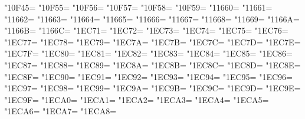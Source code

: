 \XeTeXcharclass"10F45=\KclassArabU
\XeTeXcharclass"10F55=\KclassArabU
\XeTeXcharclass"10F56=\KclassArabU
\XeTeXcharclass"10F57=\KclassArabU
\XeTeXcharclass"10F58=\KclassArabU
\XeTeXcharclass"10F59=\KclassArabU
\XeTeXcharclass"11660=\KclassArabU
\XeTeXcharclass"11661=\KclassArabU
\XeTeXcharclass"11662=\KclassArabU
\XeTeXcharclass"11663=\KclassArabU
\XeTeXcharclass"11664=\KclassArabU
\XeTeXcharclass"11665=\KclassArabU
\XeTeXcharclass"11666=\KclassArabU
\XeTeXcharclass"11667=\KclassArabU
\XeTeXcharclass"11668=\KclassArabU
\XeTeXcharclass"11669=\KclassArabU
\XeTeXcharclass"1166A=\KclassArabU
\XeTeXcharclass"1166B=\KclassArabU
\XeTeXcharclass"1166C=\KclassArabU
\XeTeXcharclass"1EC71=\KclassArabU
\XeTeXcharclass"1EC72=\KclassArabU
\XeTeXcharclass"1EC73=\KclassArabU
\XeTeXcharclass"1EC74=\KclassArabU
\XeTeXcharclass"1EC75=\KclassArabU
\XeTeXcharclass"1EC76=\KclassArabU
\XeTeXcharclass"1EC77=\KclassArabU
\XeTeXcharclass"1EC78=\KclassArabU
\XeTeXcharclass"1EC79=\KclassArabU
\XeTeXcharclass"1EC7A=\KclassArabU
\XeTeXcharclass"1EC7B=\KclassArabU
\XeTeXcharclass"1EC7C=\KclassArabU
\XeTeXcharclass"1EC7D=\KclassArabU
\XeTeXcharclass"1EC7E=\KclassArabU
\XeTeXcharclass"1EC7F=\KclassArabU
\XeTeXcharclass"1EC80=\KclassArabU
\XeTeXcharclass"1EC81=\KclassArabU
\XeTeXcharclass"1EC82=\KclassArabU
\XeTeXcharclass"1EC83=\KclassArabU
\XeTeXcharclass"1EC84=\KclassArabU
\XeTeXcharclass"1EC85=\KclassArabU
\XeTeXcharclass"1EC86=\KclassArabU
\XeTeXcharclass"1EC87=\KclassArabU
\XeTeXcharclass"1EC88=\KclassArabU
\XeTeXcharclass"1EC89=\KclassArabU
\XeTeXcharclass"1EC8A=\KclassArabU
\XeTeXcharclass"1EC8B=\KclassArabU
\XeTeXcharclass"1EC8C=\KclassArabU
\XeTeXcharclass"1EC8D=\KclassArabU
\XeTeXcharclass"1EC8E=\KclassArabU
\XeTeXcharclass"1EC8F=\KclassArabU
\XeTeXcharclass"1EC90=\KclassArabU
\XeTeXcharclass"1EC91=\KclassArabU
\XeTeXcharclass"1EC92=\KclassArabU
\XeTeXcharclass"1EC93=\KclassArabU
\XeTeXcharclass"1EC94=\KclassArabU
\XeTeXcharclass"1EC95=\KclassArabU
\XeTeXcharclass"1EC96=\KclassArabU
\XeTeXcharclass"1EC97=\KclassArabU
\XeTeXcharclass"1EC98=\KclassArabU
\XeTeXcharclass"1EC99=\KclassArabU
\XeTeXcharclass"1EC9A=\KclassArabU
\XeTeXcharclass"1EC9B=\KclassArabU
\XeTeXcharclass"1EC9C=\KclassArabU
\XeTeXcharclass"1EC9D=\KclassArabU
\XeTeXcharclass"1EC9E=\KclassArabU
\XeTeXcharclass"1EC9F=\KclassArabU
\XeTeXcharclass"1ECA0=\KclassArabU
\XeTeXcharclass"1ECA1=\KclassArabU
\XeTeXcharclass"1ECA2=\KclassArabU
\XeTeXcharclass"1ECA3=\KclassArabU
\XeTeXcharclass"1ECA4=\KclassArabU
\XeTeXcharclass"1ECA5=\KclassArabU
\XeTeXcharclass"1ECA6=\KclassArabU
\XeTeXcharclass"1ECA7=\KclassArabU
\XeTeXcharclass"1ECA8=\KclassArabU
